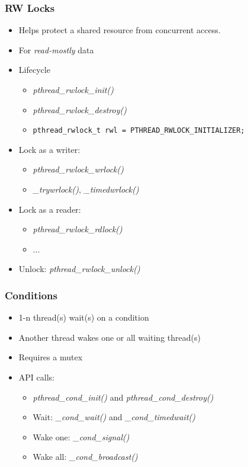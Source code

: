 \begin{frame}[fragile]
  \frametitle{RW Locks}

  \begin{itemize}
  \item Helps protect a shared resource from concurrent access.
  \item For \emph{read-mostly} data
  \item Lifecycle
    \begin{itemize}
    \item \emph{pthread\_rwlock\_init()}
    \item \emph{pthread\_rwlock\_destroy()}
    \item \verb+pthread_rwlock_t rwl = PTHREAD_RWLOCK_INITIALIZER;+
    \end{itemize}
  \item Lock as a writer:
    \begin{itemize}
    \item \emph{pthread\_rwlock\_wrlock()}
    \item \emph{\_trywrlock()},  \emph{\_timedwrlock()}
    \end{itemize}
  \item Lock as a reader:
    \begin{itemize}
    \item \emph{pthread\_rwlock\_rdlock()}
    \item ...
    \end{itemize}
  \item Unlock: \emph{pthread\_rwlock\_unlock()}
  \end{itemize}
\end{frame}


\begin{frame}
  \frametitle{Conditions}

  \begin{itemize}
  \item 1-n thread(s) wait(s) on a condition
  \item Another thread wakes one or all waiting thread(s)
  \item Requires a mutex
  \item API calls:
    \begin{itemize}
    \item \emph{pthread\_cond\_init()} and \emph{pthread\_cond\_destroy()}
    \item Wait: \emph{\_cond\_wait()} and \emph{\_cond\_timedwait()}
    \item Wake one: \emph{\_cond\_signal()}
    \item Wake all: \emph{\_cond\_broadcast()}
    \end{itemize}
  \end{itemize}
\end{frame}


